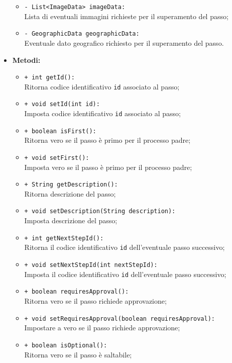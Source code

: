 \begin{flushleft}
\begin{itemize}
\begin{sloppypar}
\begin{itemize}
\item \texttt{- List<ImageData> imageData:}\\ Lista di eventuali immagini richieste per il superamento del passo;
\item \texttt{- GeographicData geographicData:}\\ Eventuale dato geografico richiesto per il superamento del passo.
\end{itemize}
\end{sloppypar}
\item \textbf{Metodi:}
\begin{sloppypar}
\begin{itemize}
\item \texttt{+ int getId():}\\ Ritorna codice identificativo \texttt{id} associato al passo;
\item \texttt{+ void setId(int id):}\\ Imposta codice identificativo \texttt{id} associato al passo;
\item \texttt{+ boolean isFirst():}\\ Ritorna vero se il passo è primo per il processo padre;
\item \texttt{+ void setFirst():}\\ Imposta vero se il passo è primo per il processo padre;
\item \texttt{+ String getDescription():}\\ Ritorna descrizione del passo;
\item \texttt{+ void setDescription(String description):}\\ Imposta descrizione del passo;
\item \texttt{+ int getNextStepId():}\\ Ritorna il codice identificativo \texttt{id} dell'eventuale passo successivo;
\item \texttt{+ void setNextStepId(int nextStepId):}\\ Imposta il codice identificativo \texttt{id} dell'eventuale passo successivo;
\item \texttt{+ boolean requiresApproval():}\\ Ritorna vero se il passo richiede approvazione;
\item \texttt{+ void setRequiresApproval(boolean requiresApproval):}\\ Impostare a vero se il passo richiede approvazione;
\item \texttt{+ boolean isOptional():}\\ Ritorna vero se il passo è saltabile;

\end{itemize}
\end{sloppypar}
\end{itemize}
\end{flushleft}
